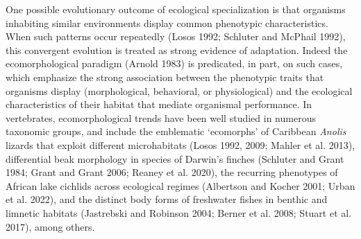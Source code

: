 \documentclass[
  11pt,
]{article}
\begin{document}
One possible evolutionary outcome of ecological specialization is that
organisms inhabiting similar environments display common phenotypic
characteristics. When such patterns occur repeatedly (Losos 1992;
Schluter and McPhail 1992), this convergent evolution is treated as
strong evidence of adaptation. Indeed the ecomorphological paradigm
(Arnold 1983) is predicated, in part, on such cases, which emphasize the
strong association between the phenotypic traits that organisms display
(morphological, behavioral, or physiological) and the ecological
characteristics of their habitat that mediate organismal performance. In
vertebrates, ecomorphological trends have been well studied in numerous
taxonomic groups, and include the emblematic `ecomorphs' of Caribbean
\emph{Anolis} lizards that exploit different microhabitats (Losos 1992,
2009; Mahler et al. 2013), differential beak morphology in species of
Darwin's finches (Schluter and Grant 1984; Grant and Grant 2006; Reaney
et al. 2020), the recurring phenotypes of African lake cichlids across
ecological regimes (Albertson and Kocher 2001; Urban et al. 2022), and
the distinct body forms of freshwater fishes in benthic and limnetic
habitats (Jastrebski and Robinson 2004; Berner et al. 2008; Stuart et
al. 2017), among others. \hfill\break
\end{document}
